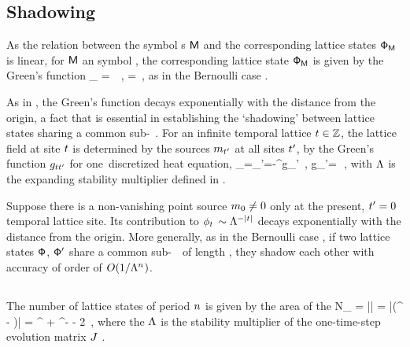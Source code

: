 \subsection{Shadowing}
\label{s:tempCatShadow}

As the
relation between the symbol {\brick}s $\mathsf{M}$  and the corresponding
lattice states $\mathsf{\Phi}_{\mathsf{M}}$ is linear, for $\mathsf{M}$ an {\admissible} symbol
\brick, the corresponding lattice state $\mathsf{\Phi}_{\mathsf{M}}$ is given by
the Green's function
\beq
\Xx_\Mm
= \gd\,\Mm
\,,\qquad
\gd = 
\,,
as in the Bernoulli case .

As in , the Green's function 
decays exponentially  with the distance from the origin, a fact that is
essential in establishing the `shadowing' between lattice states sharing
a common sub-\brick\ \Mm. For an infinite temporal lattice
$t\in\mathbb{Z}$, the lattice field at site $t$ is determined by
the sources ${m_{t'}}$ at all sites ${t'}$, by the  Green's function
$g_{tt'}$ for one\dmn\ discretized heat
equation,
\beq
  \ssp_{\zeit}=\sum_{\zeit'=-\infty}^\infty g_{\zeit\zeit'} 
\,, \qquad
g_{\zeit\zeit'}=\,
\,,
with $\Lambda$ is the expanding stability
multiplier defined in .

Suppose there is a non-vanishing point source ${m_{0}}\neq0$ only at the
present, $t'=0$ temporal lattice site. Its contribution to
$\phi_{t}$ $\sim \Lambda^{-|t|}$ decays exponentially  with the
distance from the origin. More generally, as in the Bernoulli case
, if two lattice states $\mathsf{\Phi}$, $\mathsf{\Phi}'$ share a common
sub-\brick\ \Mm\ of length \cl{}, they shadow each other with accuracy of
order of $O(1/\Lambda^{{n_{}}})$.

\subsection{\Tzeta}
\label{s:tempCatZeta}

The number of lattice states of period ${n_{}}$ is
given by the area of the {\fundPip} 
\beq
N_{\cl{}} = |\Det\jMorb|
          = |\det(\jMps^{\cl{}} - \matId)|
          = \ExpaEig^{\cl{}} + \ExpaEig^{-\cl{}} - 2
\,,
where the $\Lambda$ is the stability multiplier  of the
one-time-step evolution matrix $J$ .

